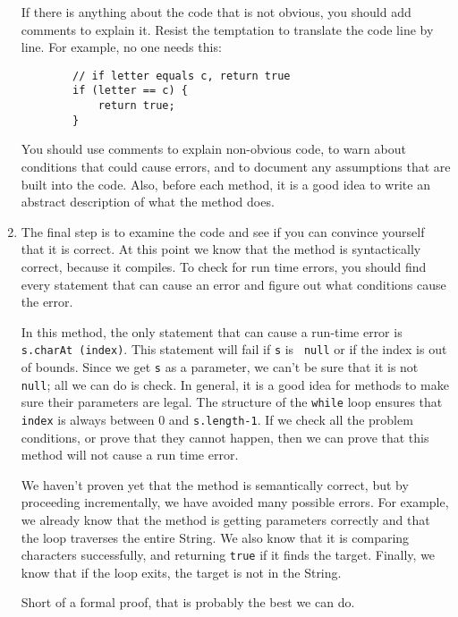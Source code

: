 \documentclass{book}
\begin{document}
\begin{enumerate}
If there is anything about the code that is not obvious, you
should add comments to explain it.  Resist the temptation to
translate the code line by line.  For example, no one needs this:

\begin{verbatim}
        // if letter equals c, return true
        if (letter == c) {
            return true;
        }
\end{verbatim}

You should use comments to explain non-obvious code, to warn
about conditions that could cause errors, and to document any
assumptions that are built into the code.  Also, before each
method, it is a good idea to write an abstract description of
what the method does.


\item The final step is to examine the code and see if you
can convince yourself that it is correct.  
At this point we know that the method is syntactically correct,
because it compiles.
To check for run time errors, you should find every statement
that can cause an error and figure out what conditions cause
the error.

In this method, the only statement that can cause a run-time error is
{\tt s.charAt (index)}.  This statement will fail if {\tt s} is {\tt
null} or if the index is out of bounds.  Since we get {\tt s} as a
parameter, we can't be sure that it is not {\tt null}; all we can do
is check.  In general, it is a good idea for methods to make sure
their parameters are legal.  The structure of the {\tt while} loop
ensures that {\tt index} is always between 0 and {\tt s.length-1}.  If
we check all the problem conditions, or prove that they cannot happen,
then we can prove that this method will not cause a run time error.

We haven't proven yet that the method is semantically correct, but by
proceeding incrementally, we have avoided many possible errors.  For
example, we already know that the method is getting parameters
correctly and that the loop traverses the entire String.  We also know
that it is comparing characters successfully, and returning {\tt true} if
it finds the target.  Finally, we know that if the loop exits,
the target is not in the String.

Short of a formal proof, that is probably the best we can do.

\end{enumerate}
\end{document}
